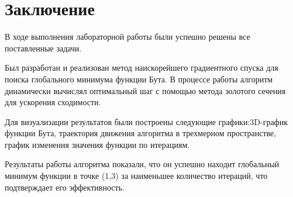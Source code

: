 \documentclass{article}%
\begin{document}
\section{Заключение}%
\begin{flushleft}%
В ходе выполнения лабораторной работы были успешно решены все поставленные задачи.%
%
\end{flushleft}%
\begin{flushleft}%
Был разработан и реализован метод наискорейшего градиентного спуска для поиска глобального минимума функции Бута. В процессе работы алгоритм динамически вычислял оптимальный шаг с помощью метода золотого сечения для ускорения сходимости.%
%
\end{flushleft}%
\begin{flushleft}%
Для визуализации результатов были построены следующие графики:3D-график функции Бута, траектория движения алгоритма в трехмерном пространстве, график изменения значения функции по итерациям.%
%
\end{flushleft}%
\begin{flushleft}%
Результаты работы алгоритма показали, что он успешно находит глобальный минимум функции в точке (1,3) за наименьшее количество итераций, что подтверждает его эффективность.%
%
\end{flushleft}%
\end{document}
